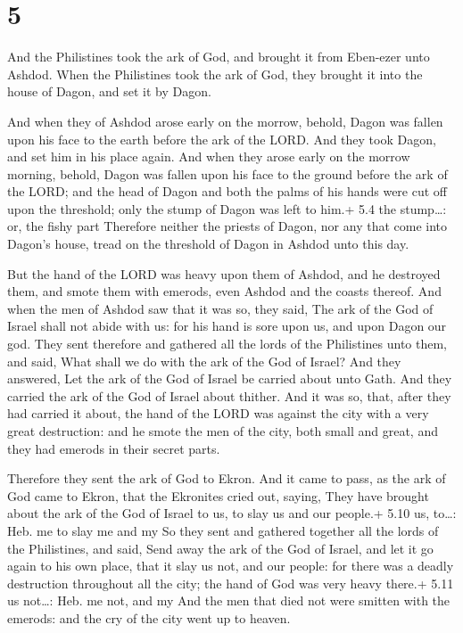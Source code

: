 \hypertarget{section-4}{%
\section{5}\label{section-4}}

 And the Philistines took the ark of God, and brought it
from Eben-ezer unto Ashdod.  When the Philistines took the
ark of God, they brought it into the house of Dagon, and set it by
Dagon.

 And when they of Ashdod arose early on the morrow,
behold, Dagon was fallen upon his face to the earth before the ark of
the LORD. And they took Dagon, and set him in his place again.
 And when they arose early on the morrow morning, behold,
Dagon was fallen upon his face to the ground before the ark of the LORD;
and the head of Dagon and both the palms of his hands were cut off upon
the threshold; only the stump of Dagon was left to him.+ 5.4 the
stump\ldots: or, the fishy part  Therefore neither the
priests of Dagon, nor any that come into Dagon's house, tread on the
threshold of Dagon in Ashdod unto this day.

 But the hand of the LORD was heavy upon them of Ashdod, and
he destroyed them, and smote them with emerods, even Ashdod and the
coasts thereof.  And when the men of Ashdod saw that it was
so, they said, The ark of the God of Israel shall not abide with us: for
his hand is sore upon us, and upon Dagon our god.  They sent
therefore and gathered all the lords of the Philistines unto them, and
said, What shall we do with the ark of the God of Israel? And they
answered, Let the ark of the God of Israel be carried about unto Gath.
And they carried the ark of the God of Israel about thither.
 And it was so, that, after they had carried it about, the
hand of the LORD was against the city with a very great destruction: and
he smote the men of the city, both small and great, and they had emerods
in their secret parts.

 Therefore they sent the ark of God to Ekron. And it came
to pass, as the ark of God came to Ekron, that the Ekronites cried out,
saying, They have brought about the ark of the God of Israel to us, to
slay us and our people.+ 5.10 us, to\ldots: Heb. me to slay me and my
 So they sent and gathered together all the lords of the
Philistines, and said, Send away the ark of the God of Israel, and let
it go again to his own place, that it slay us not, and our people: for
there was a deadly destruction throughout all the city; the hand of God
was very heavy there.+ 5.11 us not\ldots: Heb. me not, and my
 And the men that died not were smitten with the emerods:
and the cry of the city went up to heaven.

